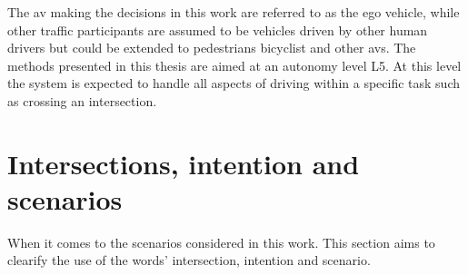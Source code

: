 
The \gls{av} making the decisions in this work are referred to as the ego vehicle, while other traffic participants are assumed to be vehicles driven by other human drivers but could be extended to pedestrians bicyclist and other \gls{av}s. 
The methods presented in this thesis are aimed at an autonomy level L5. At this level the system is expected to handle all aspects of driving within a specific task such as crossing an intersection. 

\section{Intersections, intention and scenarios}
\label{sec:intro_intersections}
When it comes to the scenarios considered in this work. This section aims to clearify the use of the words' intersection, intention and scenario.


